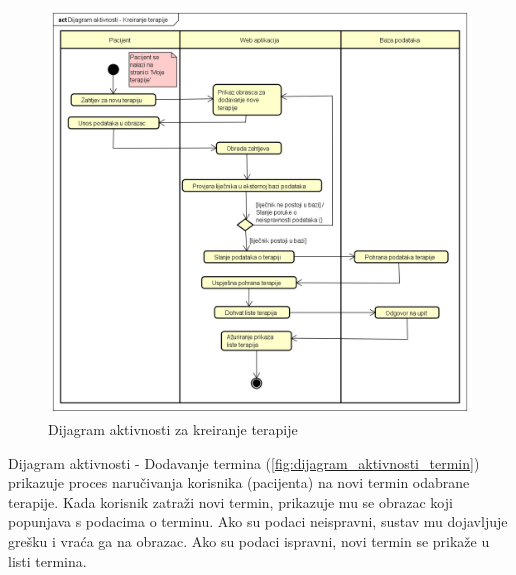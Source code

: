 \begin{figure}[H]
				\includegraphics[scale=0.3]{slike/Dijagram_aktivnosti _Kreiranje_terapije.PNG} %
				\centering
				\caption{Dijagram aktivnosti za kreiranje terapije}
				\label{fig:dijagram_aktivnoti_terapija}
			\end{figure}
Dijagram aktivnosti - Dodavanje termina (\ref{fig:dijagram_aktivnosti_termin}) prikazuje proces naručivanja korisnika (pacijenta) na novi termin odabrane terapije. Kada korisnik zatraži novi termin, prikazuje mu se obrazac koji popunjava s podacima o terminu. Ako su podaci neispravni, sustav mu dojavljuje grešku i vraća ga na obrazac. Ako su podaci ispravni, novi termin se prikaže u listi termina.

